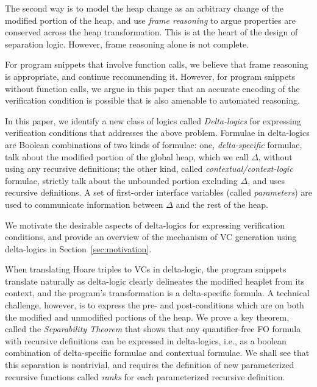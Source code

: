 The second way is to model the heap change as an arbitrary change of the modified portion of the heap, and use \emph{frame reasoning} to argue properties are conserved across the heap transformation. This is at the heart of the design of separation logic. However, frame reasoning alone is not complete. 

For program snippets that involve function calls, we believe that frame reasoning is appropriate, and continue recommending it. However, for program snippets without function calls, we argue in this paper that an accurate encoding of the verification condition is possible that is also amenable to automated reasoning.





In this paper, we identify a new class of logics called \emph{Delta-logics} for expressing verification conditions that addresses the above problem.
Formulae in delta-logics are Boolean combinations of two kinds of formulae: one, \emph{delta-specific} formulae, talk about the modified portion of the global heap, which we call $\Delta$, without using any recursive definitions; the other 
kind, called \emph{contextual/context-logic} formulae, strictly talk about the unbounded portion excluding $\Delta$, and uses recursive definitions. A set of first-order interface variables (called \emph{parameters}) are used to communicate information between $\Delta$ and the rest of the heap.

We motivate the desirable aspects of delta-logics for expressing verification conditions, and provide an overview of the mechanism of VC generation using delta-logics in  Section~\ref{sec:motivation}. 

When translating Hoare triples to VCs in delta-logic, the program snippets translate naturally
as delta-logic clearly delineates the modified heaplet from its context, and the program's transformation is a delta-specific formula. 
A technical challenge, however, is to express the pre- and post-conditions which are on both the modified and unmodified portions of the heap.
We prove a key theorem, called the \emph{Separability Theorem} that shows that any quantifier-free FO formula with recursive definitions can be expressed in delta-logics, i.e., as a boolean combination of delta-specific formulae and contextual formulae. We shall see that this separation is nontrivial, and requires the definition of new parameterized recursive functions called \emph{ranks} for each parameterized recursive definition.


